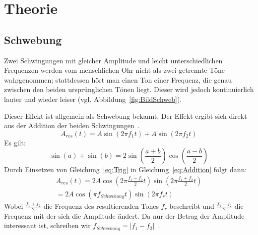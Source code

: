 \section{Theorie}
\subsection{Schwebung}
\label{sec:schwebung}
Zwei Schwingungen mit gleicher Amplitude und leicht unterschiedlichen Frequenzen werden vom menschlichen Ohr nicht als zwei getrennte Töne wahrgenommen; stattdessen hört man einen Ton einer Frequenz, die genau zwischen den beiden ursprünglichen Tönen liegt. Dieser wird jedoch kontinuierlich lauter und wieder leiser (vgl. Abbildung~\ref{fig:BildSchweb}).

Dieser Effekt ist allgemein als Schwebung bekannt. Der Effekt ergibt sich direkt aus der Addition der beiden Schwingungen~\cite[S.~149ff]{Gerthsen2004}.
\begin{equation}
    \label{eq:Addition}
    A_{res}(t) = A \sin(2\pi f_1t) + A \sin(2\pi f_2t)
\end{equation}
Es gilt:
\begin{equation}
    \label{eq:Trig}
   \sin(a) + \sin(b) = 2\sin(\frac{a+b}{2})\cos(\frac{a-b}{2})
\end{equation}
Durch Einsetzen von Gleichung~\ref{eq:Trig} in Gleichung~\ref{eq:Addition} folgt dann:
\begin{equation}
    \label{eq:Ergebnis}
    \begin{aligned}
        A_{res}(t) = 2 A \cos(2\pi \frac{f_1-f_2}{2}t) \sin(2\pi \frac{f_1+f_2}{2}t) \\
            = 2 A \cos(\pi f_{Schwebung}t) \sin(2\pi f_r t)
    \end{aligned}
\end{equation}
Wobei $\frac{f_1+f_2}{2}$ die Frequenz des resultierenden Tones $f_r$ beschreibt und $\frac{f_1-f_2}{2}$ die Frequenz mit der sich die Amplitude ändert. Da nur der Betrag der Amplitude interessant ist, schreiben wir $f_{Schwebung} = |f_1 - f_2|$~\cite[S.~149]{Gerthsen2004}.

